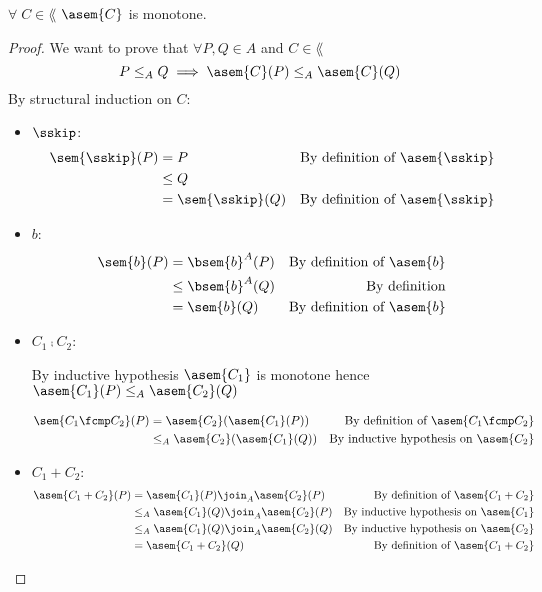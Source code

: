 \begin{theorem}[Monotonicity]
  \label{thm:asem-mono} 
  $\forall \; C \in \lang$ $\asem{C}$ is monotone.
\end{theorem}
\begin{proof}
  We want to prove that $\forall P, Q \in A$ and $C \in \lang$
  $$P \leq_A Q \implies \asem{C}(P) \leq_A \asem{C}(Q)$$
  By structural induction on $C$:
  \begin{itemize}
    \item $\sskip$:
      \begin{align*}
        \sem{\sskip}(P) 
          &= P & \text{By definition of $\asem{\sskip}$}\\
          &\leq Q \\
          &= \sem{\sskip}(Q) & \text{By definition of $\asem{\sskip}$}\\
      \end{align*}

    \item $b$:
      \begin{align*}
        \sem{b}(P) 
          &= \bsem{b}^A(P)
          & \text{By definition of $\asem{b}$}\\
          &\leq \bsem{b}^A(Q)
          & \text{By definition}\\
          &= \sem{b}(Q) & \text{By definition of $\asem{b}$}\\
      \end{align*}

    \item $C_1 \fcmp C_2$:

      By inductive hypothesis $\asem{C_1}$ is monotone hence
      $\asem{C_1}(P) \leq_A \asem{C_2}(Q)$

      \begin{align*}
        \sem{C_1 \fcmp C_2}(P) 
          &= \asem{C_2}(\asem{C_1}(P))
          &\text{By definition of $\asem{C_1 \fcmp C_2}$}\\
          &\leq_A \asem{C_2}(\asem{C_1}(Q))
          &\text{By inductive hypothesis on $\asem{C_2}$} \\
      \end{align*}
  
    \item $C_1 + C_2$:
      \begin{align*}
        \asem{C_1 + C_2}(P) 
          &= \asem{C_1}(P) \join_A \asem{C_2}(P)
          &\text{By definition of $\asem{C_1 + C_2}$}\\
          &\leq_A \asem{C_1}(Q) \join_A \asem{C_2}(P)
          &\text{By inductive hypothesis on $\asem{C_1}$} \\
          &\leq_A \asem{C_1}(Q) \join_A \asem{C_2}(Q)
          &\text{By inductive hypothesis on $\asem{C_2}$} \\
          &= \asem{C_1 + C_2}(Q) 
          &\text{By definition of $\asem{C_1 + C_2}$}\\
      \end{align*}
    

\end{itemize}
\end{proof}
